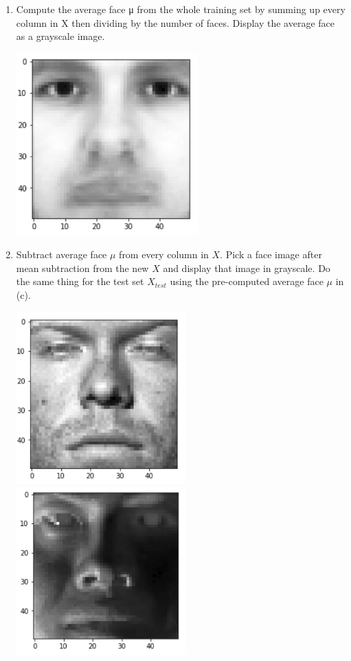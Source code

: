 \documentclass{report}
\begin{document}
\begin{enumerate}
\begin{enumerate}[label=(\alph*)]
		\item Compute the average face μ from the whole training set by summing up every
column in X then dividing by the number of faces. Display the average face as a grayscale
image.
		\begin{center}
		\includegraphics[width=7cm]{images/average_face.png}
		\end{center}
		\newpage
		\item Subtract average face $\mu$ from every column in $X$. Pick a face image after mean subtraction from the new $X$ and display that image in grayscale. Do the same thing for the test set $X_{test}$ using the pre-computed average face $\mu$ in (c).
		\begin{center}
		\includegraphics[width=6.5cm]{images/train_minus.png}
		\includegraphics[width=6.5cm]{images/test_minus.png}

\end{center}
\end{enumerate}
\end{enumerate}
\end{document}
